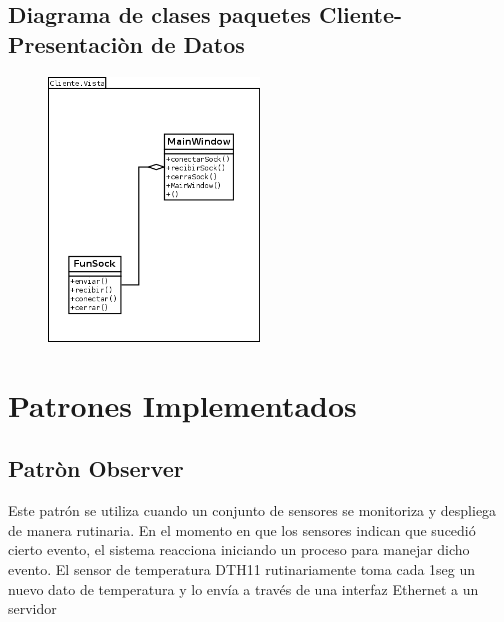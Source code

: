\subsection{\textcolor[gray]{.2}{Diagrama de clases paquetes Cliente-Presentaciòn de Datos}}


\begin{figure}[h!]
 \begin{center}
  \includegraphics[width=0.5\textwidth,keepaspectratio=true]{img/Clases_Vista.png}
  \label{fig:esquema}
 \end{center}
\end{figure}



\section{\textcolor[gray]{.2}{Patrones Implementados}}
\subsection{\textcolor[gray]{.2}{Patròn Observer }}

Este patrón se utiliza cuando un conjunto de sensores se monitoriza y despliega de manera rutinaria. En el momento en que los sensores indican que sucedió cierto evento, el sistema reacciona iniciando un proceso para manejar dicho evento.
El sensor de temperatura DTH11 rutinariamente toma cada 1seg un nuevo dato de temperatura  y lo envía a través de una interfaz Ethernet a un servidor

